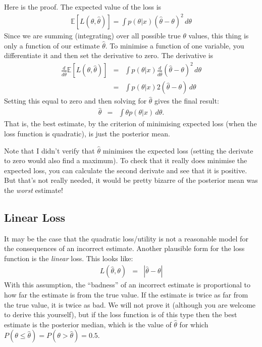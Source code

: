 Here is the proof. The expected value of the loss is
\begin{eqnarray}
\mathds{E}\left[L(\theta, \hat{\theta})\right] =
\int p(\theta|x)(\hat{\theta} - \theta)^2 \, d\theta
\end{eqnarray}
Since we are summing (integrating) over all possible true $\theta$ values, this
thing is only a function of our estimate $\hat{\theta}$. To minimise a function
of one variable, you differentiate it and then set the derivative to zero.
The derivative is
\begin{eqnarray}
\frac{d}{d\hat{\theta}}\mathds{E}\left[L(\theta, \hat{\theta})\right] &=&
\int p(\theta|x)\frac{d}{d\hat{\theta}}(\hat{\theta} - \theta)^2 \, d\theta \\
&=& \int p(\theta|x)2(\hat{\theta} - \theta) \, d\theta
\end{eqnarray}
Setting this equal to zero and then solving for $\hat{\theta}$ gives the final
result:
\begin{eqnarray}
\hat{\theta} &=& \int \theta p(\theta|x) \, d\theta.
\end{eqnarray}
That is, the best estimate, by the criterion of minimising expected loss (when
the loss function is quadratic), is just the posterior mean.

Note that I didn't verify that $\hat{\theta}$ minimises the expected loss
(setting the derivate to zero would also find a maximum). To check
that it really does minimise the expected loss, you can calculate the second
derivate and see that it is
positive. But that's not really needed, it would be pretty bizarre of the
posterior mean was the {\it worst} estimate!

\subsection{Linear Loss}
It may be the case that the quadratic loss/utility is not a reasonable model
for the consequences of an incorrect estimate. Another plausible form for the loss
function is the {\it linear} loss. This looks like:
\begin{eqnarray}
L(\hat{\theta}, \theta) &=& |\hat{\theta} - \theta|
\end{eqnarray}
With this assumption, the ``badness'' of an incorrect estimate is proportional
to how far the estimate is from the true value. If the estimate is twice as
far from the true value, it is twice as bad. We will not prove it (although you
are welcome to derive this yourself), but if the loss function is of this type
then the best estimate is the posterior median, which is the value of $\hat{\theta}$
for which $P(\theta \leq \hat{\theta}) = P(\theta > \hat{\theta}) = 0.5$.

